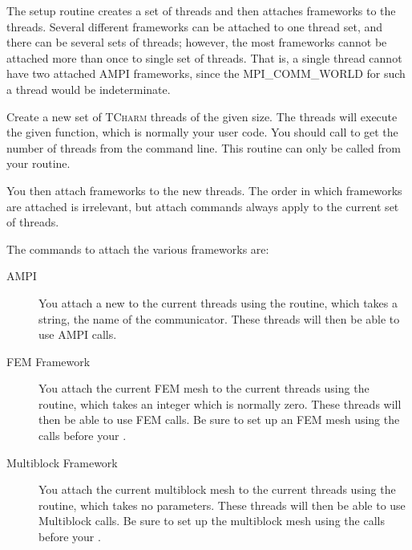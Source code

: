 \documentclass[10pt]{article}
\newcommand{\tcharm}{\textsc{TCharm}}
\begin{document}
The setup routine creates a set of threads and then attaches frameworks
to the threads.  Several different frameworks can be attached to one thread set,
and there can be several sets of threads; however, the most frameworks
cannot be attached more than once to single set of threads. That is, a single
thread cannot have two attached AMPI frameworks, since the MPI\_COMM\_WORLD 
for such a thread would be indeterminate.

\vspace{0.2in}

Create a new set of \tcharm{} threads of the given size.  The threads will
execute the given function, which is normally your user code.  
You should call  
to get the number of threads from the command line.  This routine can 
only be called from your  routine.

You then attach frameworks to the new threads.  The order in which
frameworks are attached is irrelevant, but attach commands always apply
to the current set of threads.
  
The commands to attach the various frameworks are:

\begin{description}
\item[AMPI] You attach a new  to the current threads
using the  routine, which takes a string, the name of the
communicator.  These threads will then be able to use AMPI calls.

\item[FEM Framework] You attach the current FEM mesh to the current threads
using the  routine, which takes an integer which is normally
zero.  These threads will then be able to use FEM calls.  Be sure to set up 
an FEM mesh using the  calls before your .

\item[Multiblock Framework] You attach the current multiblock mesh to the current threads
using the  routine, which takes no parameters.  
These threads will then be able to use Multiblock calls.  Be sure to set up 
the multiblock mesh using the  calls before your .

\end{description}
\end{document}
